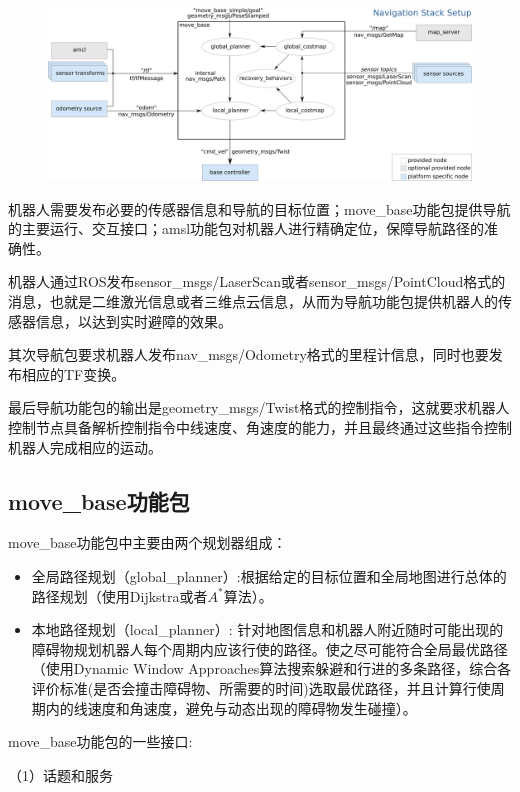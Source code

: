 \documentclass[10pt, oneside]{book}
\begin{document}
\begin{figure}[H]
    \centering
    \includegraphics[width=1.0\linewidth]{image/导航功能包框架.png}
\end{figure}

机器人需要发布必要的传感器信息和导航的目标位置；move\_base功能包提供导航的主要运行、交互接口；amsl功能包对机器人进行精确定位，保障导航路径的准确性。

机器人通过ROS发布sensor\_msgs/LaserScan或者sensor\_msgs/PointCloud格式的消息，也就是二维激光信息或者三维点云信息，从而为导航功能包提供机器人的传感器信息，以达到实时避障的效果。

其次导航包要求机器人发布nav\_msgs/Odometry格式的里程计信息，同时也要发布相应的TF变换。

最后导航功能包的输出是geometry\_msgs/Twist格式的控制指令，这就要求机器人控制节点具备解析控制指令中线速度、角速度的能力，并且最终通过这些指令控制机器人完成相应的运动。

\subsection{move\_base功能包}

move\_base功能包中主要由两个规划器组成：

\begin{itemize}
    \item 全局路径规划（global\_planner）:根据给定的目标位置和全局地图进行总体的路径规划（使用Dijkstra或者$A^{*}$算法）。
    \item 本地路径规划（local\_planner）: 针对地图信息和机器人附近随时可能出现的障碍物规划机器人每个周期内应该行使的路径。使之尽可能符合全局最优路径（使用Dynamic Window Approaches算法搜索躲避和行进的多条路径，综合各评价标准(是否会撞击障碍物、所需要的时间)选取最优路径，并且计算行使周期内的线速度和角速度，避免与动态出现的障碍物发生碰撞）。
\end{itemize}

move\_base功能包的一些接口:

（1）话题和服务
\end{document}
